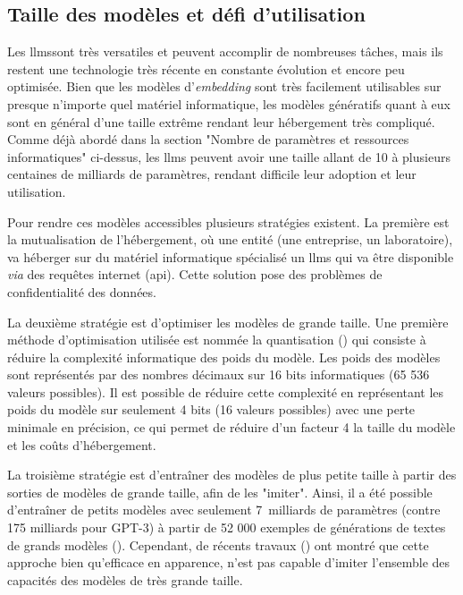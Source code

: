 \subsection{Taille des modèles et défi d'utilisation}
Les \gls{llms}sont très versatiles et peuvent accomplir de nombreuses tâches, mais ils restent une technologie très récente en constante évolution et encore peu optimisée. Bien que les modèles d'\textit{embedding} sont très facilement utilisables sur presque n'importe quel matériel informatique, les modèles génératifs quant à eux sont en général d'une taille extrême rendant leur hébergement très compliqué. Comme déjà abordé dans la section "Nombre de paramètres et ressources informatiques" ci-dessus, les \gls{llms} peuvent avoir une taille allant de 10 à plusieurs centaines de milliards de paramètres, rendant difficile leur adoption et leur utilisation.


Pour rendre ces modèles accessibles plusieurs stratégies existent. La première est la mutualisation de l'hébergement, où une entité (une entreprise, un laboratoire), va héberger sur du matériel informatique spécialisé un \gls{llms} qui va être disponible \textit{via} des requêtes internet (\gls{api}). Cette solution pose des problèmes de confidentialité des données. 

La deuxième stratégie est d'optimiser les modèles de grande taille. Une première méthode d'optimisation utilisée est nommée la quantisation (\cite{dettmers_case_2023, dettmers_llmint8_2022}) qui consiste à réduire la complexité informatique des poids du modèle. Les poids des modèles sont représentés par des nombres décimaux sur 16 bits informatiques (65 536 valeurs possibles). Il est possible de réduire cette complexité en représentant les poids du modèle sur seulement 4 bits (16 valeurs possibles) avec une perte minimale en précision, ce qui permet de réduire d'un facteur 4 la taille du modèle et les coûts d'hébergement.

La troisième stratégie est d'entraîner des modèles de plus petite taille à partir des sorties de modèles de grande taille, afin de les "imiter". Ainsi, il a été possible d'entraîner de petits modèles avec seulement 7~milliards de paramètres (contre 175 milliards pour GPT-3) à partir de 52 000 exemples de générations de textes de grands modèles (\cite{peng_instruction_2023}). Cependant, de récents travaux (\cite{gudibande_false_2023}) ont montré que cette approche bien qu'efficace en apparence, n'est pas capable d'imiter l'ensemble des capacités des modèles de très grande taille.


